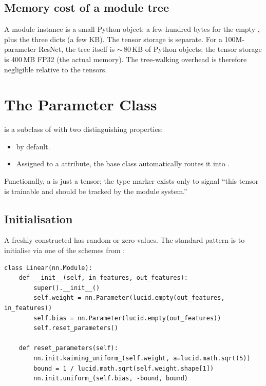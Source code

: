 \subsection{Memory cost of a module tree}
\label{ssec:module_system:memory_cost}

A module instance is a small Python object: a few hundred bytes
for the empty , plus the three dicts (a few KB).
The tensor storage is separate. For a 100M-parameter ResNet,
the tree itself is $\sim$\,80\,KB of Python objects; the tensor
storage is 400\,MB FP32 (the actual memory). The tree-walking
overhead is therefore negligible relative to the tensors.

\section{The Parameter Class}
\label{sec:module_system:parameter_class}

 is a subclass of  with
two distinguishing properties:

\begin{itemize}
  \item {} by default.
  \item Assigned to a  attribute, the base class
    automatically routes it into .
\end{itemize}

Functionally, a  is just a tensor; the type marker
exists only to signal ``this tensor is trainable and should be
tracked by the module system.''

\subsection{Initialisation}
\label{ssec:module_system:param_init}

A freshly constructed  has random or zero values.
The standard pattern is to initialise via one of the schemes from
:

\begin{lstlisting}[style=lucid,language=LucidPython]
class Linear(nn.Module):
    def __init__(self, in_features, out_features):
        super().__init__()
        self.weight = nn.Parameter(lucid.empty(out_features, in_features))
        self.bias = nn.Parameter(lucid.empty(out_features))
        self.reset_parameters()

    def reset_parameters(self):
        nn.init.kaiming_uniform_(self.weight, a=lucid.math.sqrt(5))
        bound = 1 / lucid.math.sqrt(self.weight.shape[1])
        nn.init.uniform_(self.bias, -bound, bound)
\end{lstlisting}

